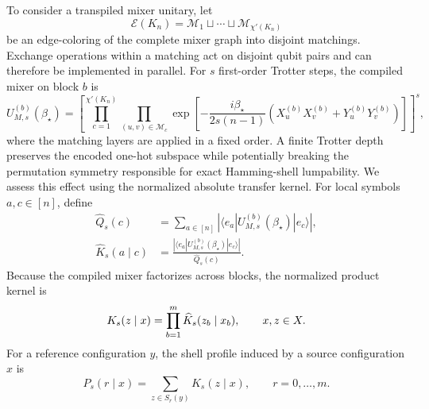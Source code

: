 \documentclass[a4paper,onecolumn,11pt,unpublished]{quantumarticle}
\theoremstyle{remark}
\begin{document}
To consider a transpiled mixer unitary, let
\[
\mathcal E(K_n)
=
\mathcal M_1\sqcup\cdots\sqcup
\mathcal M_{\chi'(K_n)}
\]
be an edge-coloring of the complete mixer graph into disjoint matchings.
Exchange operations within a matching act on disjoint qubit pairs and can
therefore be implemented in parallel. For \(s\) first-order Trotter steps, the
compiled mixer on block \(b\) is
\begin{equation}
U_{M,s}^{(b)}(\beta_\star)
=
\left[
\prod_{c=1}^{\chi'(K_n)}
\prod_{(u,v)\in\mathcal M_c}
\exp\!\left[
-\frac{i\beta_\star}{2s(n-1)}
\left(
X_u^{(b)}X_v^{(b)}
+
Y_u^{(b)}Y_v^{(b)}
\right)
\right]
\right]^s,
\label{eq:trotterized-block-mixer}
\end{equation}
where the matching layers are applied in a fixed order. A finite Trotter
depth preserves the encoded one-hot subspace while potentially breaking the
permutation symmetry responsible for exact Hamming-shell lumpability. We
assess this effect using the normalized absolute transfer kernel. For local
symbols \(a,c\in[n]\), define
\begin{align}
\widehat Q_s(c)
&=
\sum_{a\in[n]}
\left|
\langle e_a|
U_{M,s}^{(b)}(\beta_\star)
|e_c\rangle
\right|,
\\
\widehat K_s(a\mid c)
&=
\frac{
\left|
\langle e_a|
U_{M,s}^{(b)}(\beta_\star)
|e_c\rangle
\right|
}{
\widehat Q_s(c)
}.
\label{eq:trotter-local-normalized-kernel}
\end{align}
Because the compiled mixer factorizes across blocks, the normalized product
kernel is
\begin{equation}
K_s(z\mid x)
=
\prod_{b=1}^{m}
\widehat K_s(z_b\mid x_b),
\qquad
x,z\in \mathcal \mathcal X.
\label{eq:trotter-product-normalized-kernel}
\end{equation}
For a reference configuration \(y\), the shell profile induced by a source
configuration \(x\) is
\begin{equation}
P_s(r\mid x)
=
\sum_{z\in S_r(y)}
K_s(z\mid x),
\qquad
r=0,\ldots,m.
\label{eq:trotter-shell-profile}
\end{equation}
\end{document}

